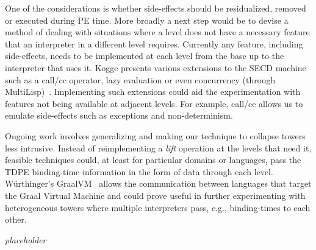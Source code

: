\documentclass[sigplan,anonymous,review]{acmart}
\newcommand{\mevl}{$M_{e}$}
\theoremstyle{definition}
\begin{document}
One of the considerations is whether side-effects should be residualized, removed or executed during PE time. More broadly a next step would be to devise a method of dealing with situations where a level does not have a necessary feature that an interpreter in a different level requires.
Currently any feature, including side-effects, needs to be implemented at each level from the base up to the interpreter that uses it.
Kogge presents various extensions to the SECD machine such as a call/cc operator, lazy evaluation or even concurrency (through MultiLisp)~\cite{kogge1990architecture}. Implementing such extensions could aid the experimentation with features not being available at adjacent levels. For example, call/cc allows us to emulate side-effects such as exceptions and non-determinism.



Ongoing work involves generalizing and making our technique to collapse towers less intrusive. Instead of reimplementing a \textit{lift} operation at the levels that need it, feasible techniques could, at least for particular domains or languages, pass the TDPE binding-time information in the form of data through each level. W{\"u}rthinger's GraalVM~\cite{wurthinger2013one} allows the communication between languages that target the Graal Virtual Machine and could prove useful in further experimenting with heterogeneous towers where multiple interpreters pass, e.g., binding-times to each other.

\begin{acks}
\textit{placeholder}
\end{acks}




\end{document}
